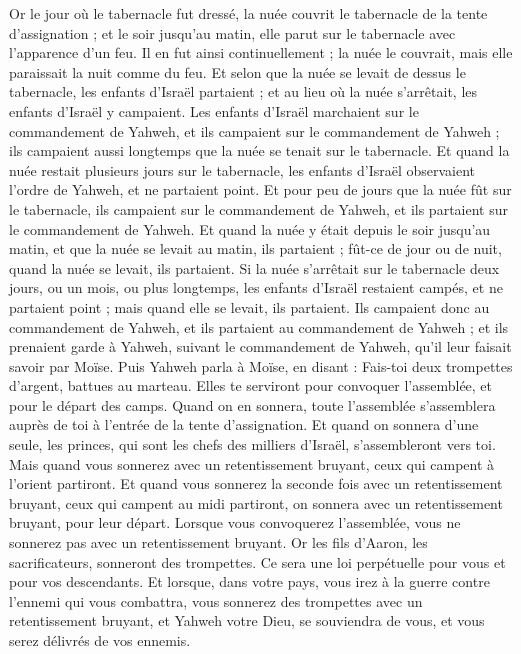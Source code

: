 \begin{multicols}{2}
Or le jour où le tabernacle fut dressé, la nuée couvrit le tabernacle de la tente d'assignation ; et le soir jusqu'au matin, elle parut sur le tabernacle avec l'apparence d'un feu.
Il en fut ainsi continuellement ; la nuée le couvrait, mais elle paraissait la nuit comme du feu.
Et selon que la nuée se levait de dessus le tabernacle, les enfants d'Israël partaient ; et au lieu où la nuée s'arrêtait, les enfants d'Israël y campaient.
Les enfants d'Israël marchaient sur le commandement de Yahweh, et ils campaient sur le commandement de Yahweh ; ils campaient aussi longtemps que la nuée se tenait sur le tabernacle.
Et quand la nuée restait plusieurs jours sur le tabernacle, les enfants d'Israël observaient l'ordre de Yahweh, et ne partaient point.
Et pour peu de jours que la nuée fût sur le tabernacle, ils campaient sur le commandement de Yahweh, et ils partaient sur le commandement de Yahweh.
Et quand la nuée y était depuis le soir jusqu'au matin, et que la nuée se levait au matin, ils partaient ; fût-ce de jour ou de nuit, quand la nuée se levait, ils partaient.
Si la nuée s'arrêtait sur le tabernacle deux jours, ou un mois, ou plus longtemps, les enfants d'Israël restaient campés, et ne partaient point ; mais quand elle se levait, ils partaient.
Ils campaient donc au commandement de Yahweh, et ils partaient au commandement de Yahweh ; et ils prenaient garde à Yahweh, suivant le commandement de Yahweh, qu'il leur faisait savoir par Moïse.
\VerseOne{}Puis Yahweh parla à Moïse, en disant :
Fais-toi deux trompettes d'argent, battues au marteau. Elles te serviront pour convoquer l'assemblée, et pour le départ des camps.
Quand on en sonnera, toute l'assemblée s'assemblera auprès de toi à l'entrée de la tente d'assignation.
Et quand on sonnera d'une seule, les princes, qui sont les chefs des milliers d'Israël, s'assembleront vers toi.
Mais quand vous sonnerez avec un retentissement bruyant, ceux qui campent à l'orient partiront.
Et quand vous sonnerez la seconde fois avec un retentissement bruyant, ceux qui campent au midi partiront, on sonnera avec un retentissement bruyant, pour leur départ.
Lorsque vous convoquerez l'assemblée, vous ne sonnerez pas avec un retentissement bruyant.
Or les fils d'Aaron, les sacrificateurs, sonneront des trompettes. Ce sera une loi perpétuelle pour vous et pour vos descendants.
Et lorsque, dans votre pays, vous irez à la guerre contre l'ennemi qui vous combattra, vous sonnerez des trompettes avec un retentissement bruyant, et Yahweh votre Dieu, se souviendra de vous, et vous serez délivrés de vos ennemis.

\end{multicols}
